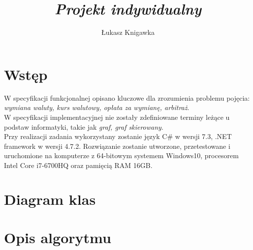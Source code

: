 \documentclass[a4paper,11pt]{article}
\title{ \sc{Specyfikacja implementacyjna} \\
\emph{Projekt indywidualny} }
\author{Łukasz Knigawka}
\newcommand\tab[1][0.6cm]{\hspace*{#1}}
\begin{document}
\maketitle

\thispagestyle{empty}

\tableofcontents

\newpage

\section{Wstęp}
\tab W specyfikacji funkcjonalnej opisano kluczowe dla zrozumienia problemu pojęcia: \textit{wymiana waluty, kurs walutowy, opłata za wymianę, arbitraż}.
\\\tab W specyfikacji implementacyjnej nie zostały zdefiniowane terminy leżące u podstaw informatyki, takie jak \textit{graf, graf skierowany}. 
\\\tab Przy realizacji zadania wykorzystany zostanie język C\# w wersji 7.3, .NET framework w wersji 4.7.2. Rozwiązanie zostanie utworzone, przetestowane i uruchomione na komputerze z 64-bitowym systemem Windows10, procesorem Intel Core i7-6700HQ oraz pamięcią RAM 16GB. 



\section{Diagram klas}

\section{Opis algorytmu}
\end{document}
